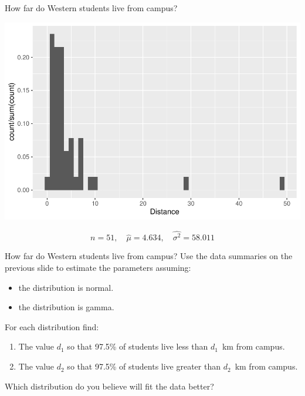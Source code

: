 \begin{frame}
\begin{block}{How far do Western students live from campus?}
\begin{center}
\includegraphics[height=.5\textheight]{figure/histogram-1.pdf}
\end{center}

$$
n=51,\quad
\hat \mu = 4.634,\quad
\widehat{\sigma^2} = 58.011 
$$
\end{block}
\end{frame}

\begin{frame}


\begin{block}{How far do Western students live from campus?}
Use the data summaries on the previous slide to estimate the parameters assuming:
\begin{itemize}
\item the distribution is normal.
\item the distribution is gamma.
\end{itemize}
\end{block}
For each distribution find:
\begin{enumerate}
\item The value $d_1$ so that 97.5\% of students live less than $d_1$~km from campus.
\item The value $d_2$ so that 97.5\% of students live greater than $d_2$~km from campus.
\end{enumerate}

\begin{center}
Which distribution do you believe will fit the data better?
\end{center}
\end{frame}


